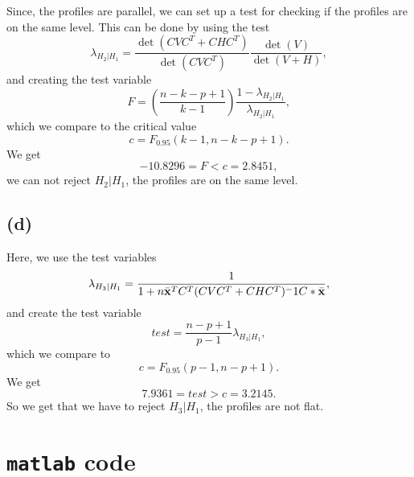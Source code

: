 Since, the profiles are parallel, we can set up a test for checking if
the profiles are on the same level. This can be done by using the test
\begin{equation*}
  \lambda_{H_2 | H_1} = \frac{\det(CVC^T + CHC^T)}{\det(CVC^T)}\frac{\det(V)}{\det(V+H)},
\end{equation*}
and creating the test variable 
\begin{equation*}
  F = \left(\frac{n-k - p +1}{k - 1}\right)\frac{1 - \lambda_{H_2 |H_1}}{\lambda_{H_2 | H_1}},
\end{equation*}
which we compare to the critical value
\begin{equation*}
  c = F_{0.95} (k-1, n - k - p +1).
\end{equation*}
We get
\begin{equation*}
  -10.8296 = F < c = 2.8451,
\end{equation*}
we can not reject $H_2 | H_1$, the profiles are on the same level.

\subsection*{(d)}
\label{sec:d-1}

Here, we use the test variables 
\begin{equation*}
  \lambda_{H_3 | H_1} = \frac{1}{1 + n \bar{\bf x}^T C^T (CVC^T +
    CHC^T)^-1C*\bar{\bf x}},
\end{equation*}
and create the test variable
\begin{equation*}
  test = \frac{n - p +1}{p - 1}\lambda_{H_3 |H_1},
\end{equation*}
which we compare to 
\begin{equation*}
  c = F_{0.95}(p-1, n-p+1).
\end{equation*}
We get
\begin{equation*}
  7.9361 = test > c = 3.2145.
\end{equation*}
So we get that we have to reject $H_3 | H_1$, the profiles are not
flat.

\section*{\texttt{matlab} code}
\label{sec:textttmatlab-code}


